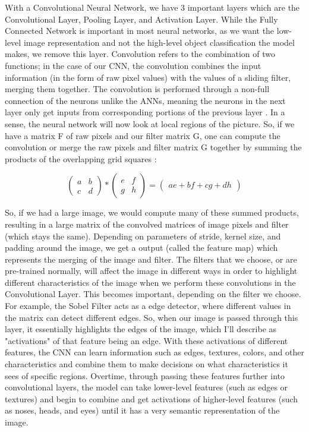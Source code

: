 \documentclass[10pt,twocolumn]{article}
\begin{document}
With a Convolutional Neural Network, we have 3 important layers which are the Convolutional Layer, Pooling Layer, and Activation Layer. While the Fully Connected Network is important in most neural networks, as we want the low-level image representation and not the high-level object classification the model makes, we remove this layer. Convolution refers to the combination of two functions; in the case of our CNN, the convolution combines the input information (in the form of raw pixel values) with the values of a sliding filter, merging them together. The convolution is performed through a non-full connection of the neurons unlike the ANNs, meaning the neurons in the next layer only get inputs from corresponding portions of the previous layer \cite{Albawi2017}. In a sense, the neural network will now look at local regions of the picture. So, if we have a matrix F of raw pixels and our filter matrix G, one can compute the convolution or merge the raw pixels and filter matrix G together by summing the products of the overlapping grid squares \cite{Dumoulin2018}:

$$ \begin{pmatrix} a & b \\ c & d \end{pmatrix} * \begin{pmatrix} e & f \\ g & h \end{pmatrix} = \begin{pmatrix} ae + bf + cg + dh \end{pmatrix} $$ 

So, if we had a large image, we would compute many of these summed products, resulting in a large matrix of the convolved matrices of image pixels and filter (which stays the same). Depending on parameters of stride, kernel size, and padding around the image, we get a output (called the feature map) which represents the merging of the image and filter. The filters that we choose, or are pre-trained normally, will affect the image in different ways in order to highlight different characteristics of the image when we perform these convolutions in the Convolutional Layer. This becomes important, depending on the filter we choose. For example, the Sobel Filter \cite{Bogdan2019} acts as a edge detector, where different values in the matrix can detect different edges. So, when our image is passed through this layer, it essentially highlights the edges of the image, which I'll describe as "activations" of that feature being an edge. With these activations of different features, the CNN can learn information such as edges, textures, colors, and other characteristics and combine them to make decisions on what characteristics it sees of specific regions. Overtime, through passing these features further into convolutional layers, the model can take lower-level features (such as edges or textures) and begin to combine and get activations of higher-level features (such as noses, heads, and eyes) until it has a very semantic representation of the image.
\end{document}
